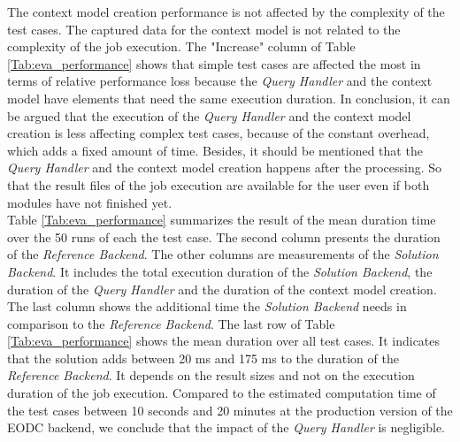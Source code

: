 \documentclass[draft,final]{vutinfth} %
\begin{document}
The context model creation performance is not affected by the complexity of the test cases. The captured data for the context model is not related to the complexity of the job execution. The "Increase" column of Table \ref{Tab:eva_performance} shows that simple test cases are affected the most in terms of relative performance loss because the \textit{Query Handler} and the context model have elements that need the same execution duration. In conclusion, it can be argued that the execution of the \textit{Query Handler} and the context model creation is less affecting complex test cases, {because of the constant overhead, which adds a fixed amount of time}. Besides, it should be mentioned that the \textit{Query Handler} and the context model creation happens after the processing. So that the result files of the job execution are available for the user even if both modules have not finished yet. \\
Table \ref{Tab:eva_performance} summarizes the result of the mean duration time over the 50 runs of each the test case. The second column presents the duration of the \textit{Reference Backend}. The other columns are measurements of the \textit{Solution Backend}. It includes the total execution duration of the \textit{Solution Backend}, the duration of the \textit{Query Handler} and the duration of the context model creation. The last column shows the additional time the \textit{Solution Backend} needs in comparison to the \textit{Reference Backend}. The last row of Table \ref{Tab:eva_performance} shows the mean duration over all test cases. It indicates that the solution adds between 20 ms and 175 ms to the duration of the \textit{Reference Backend}. It depends on the result sizes and not on the execution duration of the job execution. Compared to the estimated computation time of the test cases between 10 seconds and 20 minutes at the production version of the EODC backend, we conclude that the impact of the \textit{Query Handler} is negligible.
\end{document}
